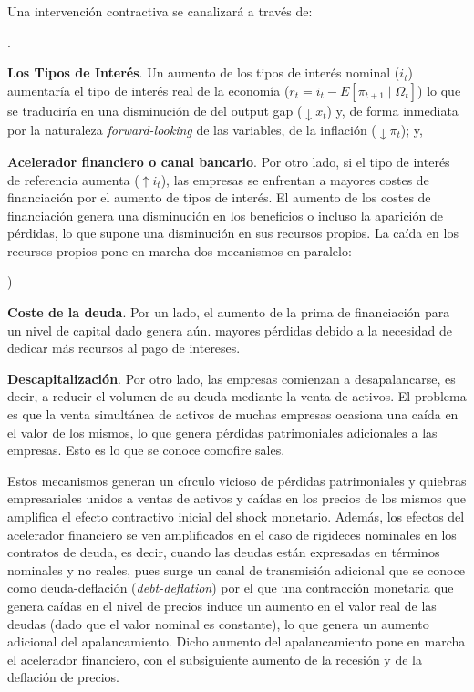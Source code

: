 \documentclass[10pt,a4paper]{article}
\newcounter{alphaitem}
\newcounter{numitem}
\newenvironment{la}
      {\begin{list}{\alph{alphaitem})}{%
          \usecounter{alphaitem}%
          \setlength{\leftmargin}{1cm}%
          \setlength{\parskip}{3pt}%
          \setlength{\itemsep}{0pt}%
          \setlength{\parsep}{0pt}%
      }}
      {\end{list}}
\newenvironment{lnum}
      {\begin{list}{\arabic{numitem}.}{%
          \usecounter{numitem}%
          \setlength{\leftmargin}{1cm}%
          \setlength{\parskip}{3pt}%
          \setlength{\itemsep}{0pt}%
          \setlength{\parsep}{0pt}%
      }}
      {\end{list}}
\begin{document}
Una intervención contractiva se canalizará a través de:
\begin{lnum}
    \item \textbf{Los Tipos de Interés}. Un aumento de los tipos de interés nominal ($i_t$) aumentaría el tipo de interés real de la economía ($r_t=i_t-E[\pi_{t+1}\;|\;\Omega_t]$) lo que se traduciría en una disminución de del output gap ($\downarrow x_t$) y, de forma inmediata por la naturaleza \textit{forward-looking} de las variables, de la inflación ($\downarrow \pi_t$); y,
    \item \textbf{Acelerador financiero o canal bancario}. Por otro lado, si el tipo de interés de referencia aumenta ($\uparrow i_t$), las empresas se enfrentan a mayores costes de financiación por el aumento de tipos de interés. El aumento de los costes de financiación genera una disminución en los beneficios o incluso la aparición de pérdidas, lo que supone una disminución en sus recursos propios. La caída en los recursos propios pone en marcha dos mecanismos en paralelo:
    \begin{la}
        \item \textbf{Coste de la deuda}. Por un lado, el aumento de la prima de financiación para un nivel de capital dado genera aún. mayores pérdidas debido a la necesidad de dedicar más recursos al pago de intereses. 
        \item \textbf{Descapitalización}. Por otro lado, las empresas comienzan a desapalancarse, es decir, a reducir el volumen de su deuda mediante la venta de activos. El problema es que la venta simultánea de activos de muchas empresas ocasiona una caída en el valor de los mismos, lo que genera pérdidas patrimoniales adicionales a las empresas. Esto es lo que se conoce comofire sales. 
    \end{la}
    Estos mecanismos generan un círculo vicioso de pérdidas patrimoniales y quiebras empresariales unidos a ventas de activos y caídas en los precios de los mismos que amplifica el efecto contractivo inicial del shock monetario. Además, los efectos del acelerador financiero se ven amplificados en el caso de rigideces nominales en los contratos de deuda, es decir, cuando las deudas están expresadas en términos nominales y no reales, pues surge un canal de transmisión adicional que se conoce como deuda-deflación (\textit{debt-deflation}) por el que una contracción monetaria que genera caídas en el nivel de precios induce un aumento en el valor real de las deudas (dado que el valor nominal es constante), lo que genera un aumento adicional del apalancamiento. Dicho aumento del apalancamiento pone en marcha el acelerador financiero, con el subsiguiente aumento de la recesión y de la deflación de precios. 
\end{lnum}
\end{document}
